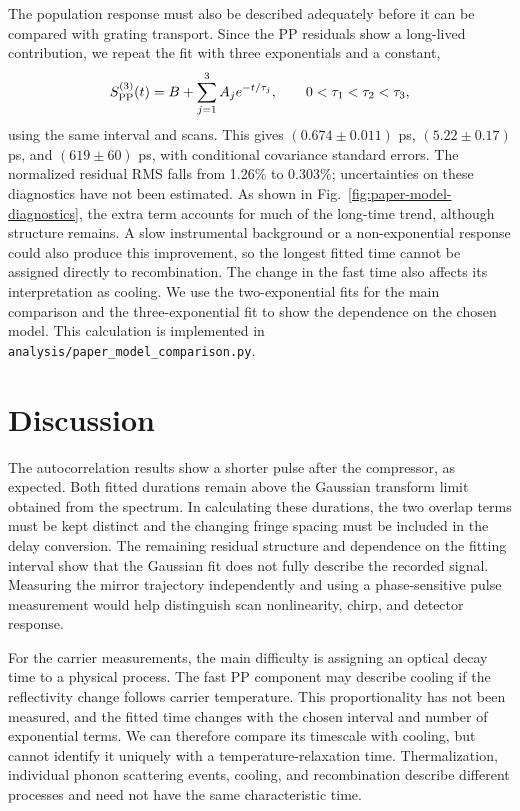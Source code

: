 \documentclass[11pt,a4paper]{article}
\begin{document}
The population response must also be described adequately before it can be compared with grating transport. Since the PP residuals show a long-lived contribution, we repeat the fit with three exponentials and a constant,
\begin{equation}
S_{\rm PP}^{(3)}(t)=B+\sum_{j=1}^3 A_j e^{-t/\tau_j},\qquad
0<\tau_1<\tau_2<\tau_3,
\end{equation}
using the same interval and scans. This gives $(0.674\pm0.011)$ ps, $(5.22\pm0.17)$ ps, and $(619\pm60)$ ps, with conditional covariance standard errors. The normalized residual RMS falls from 1.26\% to 0.303\%; uncertainties on these diagnostics have not been estimated. As shown in Fig.~\ref{fig:paper-model-diagnostics}, the extra term accounts for much of the long-time trend, although structure remains. A slow instrumental background or a non-exponential response could also produce this improvement, so the longest fitted time cannot be assigned directly to recombination. The change in the fast time also affects its interpretation as cooling. We use the two-exponential fits for the main comparison and the three-exponential fit to show the dependence on the chosen model. This calculation is implemented in \texttt{analysis/paper\_model\_comparison.py}.

\section{Discussion}
The autocorrelation results show a shorter pulse after the compressor, as expected. Both fitted durations remain above the Gaussian transform limit obtained from the spectrum. In calculating these durations, the two overlap terms must be kept distinct and the changing fringe spacing must be included in the delay conversion. The remaining residual structure and dependence on the fitting interval show that the Gaussian fit does not fully describe the recorded signal. Measuring the mirror trajectory independently and using a phase-sensitive pulse measurement would help distinguish scan nonlinearity, chirp, and detector response.

For the carrier measurements, the main difficulty is assigning an optical decay time to a physical process. The fast PP component may describe cooling if the reflectivity change follows carrier temperature. This proportionality has not been measured, and the fitted time changes with the chosen interval and number of exponential terms. We can therefore compare its timescale with cooling, but cannot identify it uniquely with a temperature-relaxation time. Thermalization, individual phonon scattering events, cooling, and recombination describe different processes and need not have the same characteristic time.
\end{document}
